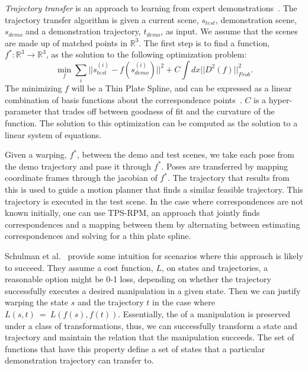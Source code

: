 \emph{Trajectory transfer} is an approach to learning from expert demonstrations~\cite{Schulmanetal_ISRR2013}. The trajectory transfer
algorithm is given a current scene, $s_{test}$, demonstration scene, $s_{demo}$ and a demonstration trajectory,  
$t_{demo}$, as input. We assume that the scenes are made up of matched points in $\mathbb{R}^3$. The first step is to 
find a function, $f^*:\mathbb{R}^3 \rightarrow \mathbb{R}^3$, as the solution to the following optimization problem:
\begin{equation}\min_f \sum_i ||s_{test}^{(i)} - f(s_{demo}^{(i)})||^2 + C\int dx ||D^2(f)||^2_{Frob}.\label{eq:tps}\end{equation}
The minimizing $f$ will be a Thin Plate Spline, and can be expressed as a linear combination of basis
functions about the correspondence points~\cite{Wahba_TPS1990}. $C$ is a hyper-parameter that trades off
between goodness of fit and the curvature of the function. The solution to this optimization can be computed
as the solution to a linear system of equations.

Given a warping, $f^*$, between the demo and test scenes, we take each pose from the demo trajectory and pase it through
$f^*$. Poses are transferred by mapping coordinate frames through the jacobian of $f^*$. The trajectory that results from this
is used to guide a motion planner that finds a similar feasible trajectory. This trajectory is executed in the test scene.
In the case where correspondences are not known initially, one can use TPS-RPM, an approach that jointly finds
correspondences and a mapping between them by alternating between estimating correspondences and solving for 
a thin plate spline\cite{Chui_CVIU2003}.

Schulman et al.~\cite{Schulmanetal_ISRR2013} provide some intuition for scenarios where this approach is likely
to succeed. They assume a cost function, $L$, on states and trajectories, a reasonable option might be 0-1 loss, depending
on whether the trajectory successfully executes a desired manipulation in a given state.  Then we can justify warping the
state $s$ and the trajectory $t$ 
in the case where $L(s, t)~=~L(f(s), f(t))$. Essentially, the of a manipulation is preserved under a class of transformations,
thus, we can successfully transform a state and trajectory and maintain the relation that the manipulation succeeds. The set of functions
that have this property define a set of states that a particular demonstration trajectory can transfer to.

